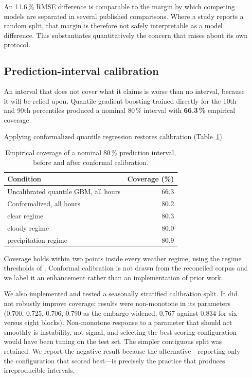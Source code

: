 \documentclass[conference]{IEEEtran}
\begin{document}
An 11.6\,\% RMSE difference is comparable to the margin by which
competing models are separated in several published comparisons. Where
a study reports a random split, that margin is therefore not safely
interpretable as a model difference. This substantiates quantitatively
the concern that \cite{P5} raises about its own protocol.

\subsection{Prediction-interval calibration}
\label{sec:f3}

An interval that does not cover what it claims is worse than no
interval, because it will be relied upon. Quantile gradient boosting
trained directly for the 10th and 90th percentiles produced a nominal
80\,\% interval with \textbf{66.3\,\%} empirical coverage.

Applying conformalized quantile regression \cite{romano2019} restores
calibration (Table~\ref{tab:f3}).

\begin{table}[!t]
\caption{Empirical coverage of a nominal 80\,\% prediction interval,
before and after conformal calibration.}
\label{tab:f3}
\centering
\begin{tabular}{lr}
\toprule
Condition & Coverage (\%) \\
\midrule
Uncalibrated quantile GBM, all hours & 66.3 \\
\midrule
Conformalized, all hours   & 80.2 \\
\quad clear regime         & 80.3 \\
\quad cloudy regime        & 80.0 \\
\quad precipitation regime & 80.9 \\
\bottomrule
\end{tabular}
\end{table}

Coverage holds within two points inside every weather regime, using the
regime thresholds of \cite{P3}. Conformal calibration is not drawn from
the reconciled corpus and we label it an enhancement rather than an
implementation of prior work.

We also implemented and tested a seasonally stratified calibration
split. It did not robustly improve coverage: results were non-monotone
in its parameters (0.700, 0.725, 0.706, 0.790 as the embargo widened;
0.767 against 0.834 for six versus eight blocks). Non-monotone response
to a parameter that should act smoothly is instability, not signal, and
selecting the best-scoring configuration would have been tuning on the
test set. The simpler contiguous split was retained. We report the
negative result because the alternative---reporting only the
configuration that scored best---is precisely the practice that
produces irreproducible intervals.
\end{document}
